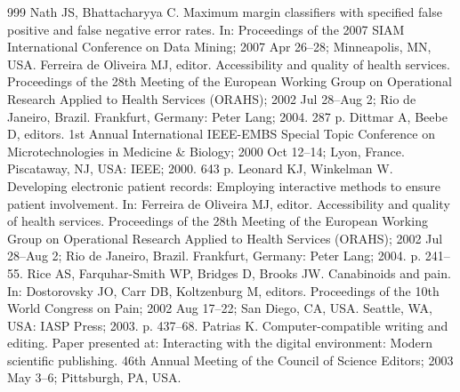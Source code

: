 \documentclass[journal,article,submit,moreauthors,pdftex]{Definitions/tsp}
\begin{document}
\begin{thebibliography}{999}
Nath JS, Bhattacharyya C. Maximum margin classifiers with specified false positive and false negative error rates. In: Proceedings of the 2007 SIAM International Conference on Data Mining; 2007 Apr 26--28; Minneapolis, MN, USA.
Ferreira de Oliveira MJ, editor. Accessibility and quality of health services. Proceedings of the 28th Meeting of the European Working Group on Operational Research Applied to Health Services (ORAHS); 2002 Jul 28--Aug 2; Rio de Janeiro, Brazil. Frankfurt, Germany: Peter Lang; 2004. 287 p.
Dittmar A, Beebe D, editors. 1st Annual International IEEE-EMBS Special Topic Conference on Microtechnologies in Medicine \& Biology; 2000 Oct 12--14; Lyon, France. Piscataway, NJ, USA: IEEE; 2000. 643 p.
Leonard KJ, Winkelman W. Developing electronic patient records: Employing interactive methods to ensure patient involvement. In: Ferreira de Oliveira MJ, editor. Accessibility and quality of health services. Proceedings of the 28th Meeting of the European Working Group on Operational Research Applied to Health Services (ORAHS); 2002 Jul 28--Aug 2; Rio de Janeiro, Brazil. Frankfurt, Germany: Peter Lang; 2004. p. 241--55.
Rice AS, Farquhar-Smith WP, Bridges D, Brooks JW. Canabinoids and pain. In: Dostorovsky JO, Carr DB, Koltzenburg M, editors. Proceedings of the 10th World Congress on Pain; 2002 Aug 17--22; San Diego, CA, USA. Seattle, WA, USA: IASP Press; 2003. p. 437--68.
Patrias K. Computer-compatible writing and editing. Paper presented at: Interacting with the digital environment: Modern scientific publishing. 46th Annual Meeting of the Council of Science Editors; 2003 May 3--6; Pittsburgh, PA, USA.


\end{thebibliography}
\end{document}
